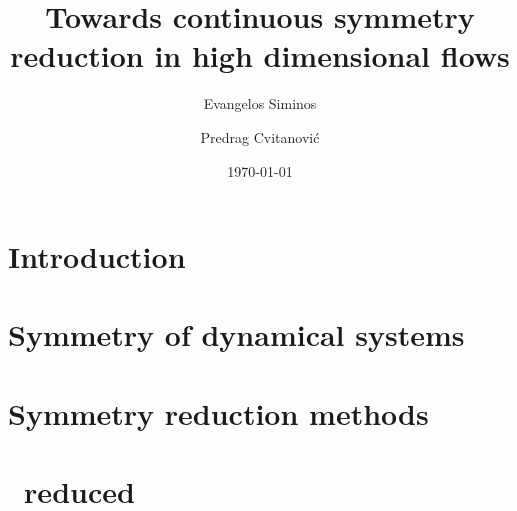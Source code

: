 \documentclass[aps,pre,preprint,groupedaddress]{revtex4}
\begin{document}
\title{Towards continuous symmetry reduction in high dimensional flows}
\author{Evangelos Siminos}
\author{Predrag Cvitanovi\'c}

\date{\today}

\begin{abstract}
\end{abstract}

\pacs{}

\maketitle

\section{\label{s:intro} Introduction}
    

\subsection{\label{s:introCLE} \CLe}
    

\section{\label{s:symDyn} Symmetry of dynamical systems}
    

\section{\label{s:symRedGeneral} Symmetry reduction methods}

    

\section{\label{s:CLeReduced} \CLe\ reduced \statesp}
    
\end{document}
